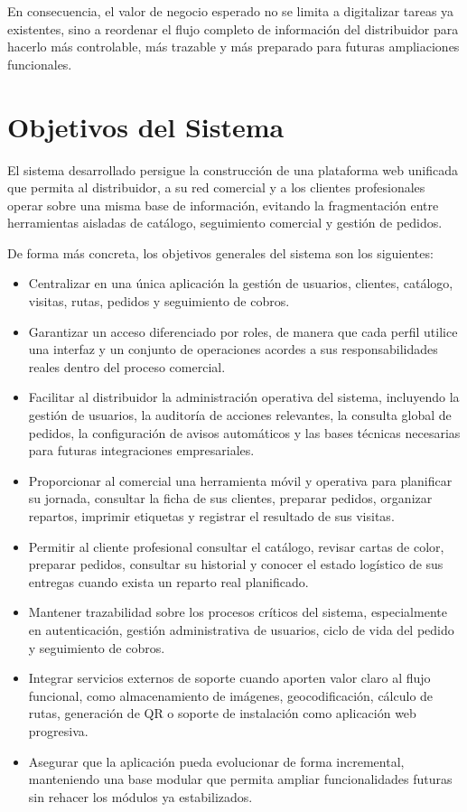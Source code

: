 En consecuencia, el valor de negocio esperado no se limita a digitalizar tareas ya existentes, sino a reordenar el flujo completo de información del distribuidor para hacerlo más controlable, más trazable y más preparado para futuras ampliaciones funcionales.

\section{Objetivos del Sistema}
El sistema desarrollado persigue la construcción de una plataforma web unificada que permita al distribuidor, a su red comercial y a los clientes profesionales operar sobre una misma base de información, evitando la fragmentación entre herramientas aisladas de catálogo, seguimiento comercial y gestión de pedidos.

De forma más concreta, los objetivos generales del sistema son los siguientes:

\begin{itemize}
    \item Centralizar en una única aplicación la gestión de usuarios, clientes, catálogo, visitas, rutas, pedidos y seguimiento de cobros.
    \item Garantizar un acceso diferenciado por roles, de manera que cada perfil utilice una interfaz y un conjunto de operaciones acordes a sus responsabilidades reales dentro del proceso comercial.
    \item Facilitar al distribuidor la administración operativa del sistema, incluyendo la gestión de usuarios, la auditoría de acciones relevantes, la consulta global de pedidos, la configuración de avisos automáticos y las bases técnicas necesarias para futuras integraciones empresariales.
    \item Proporcionar al comercial una herramienta móvil y operativa para planificar su jornada, consultar la ficha de sus clientes, preparar pedidos, organizar repartos, imprimir etiquetas y registrar el resultado de sus visitas.
    \item Permitir al cliente profesional consultar el catálogo, revisar cartas de color, preparar pedidos, consultar su historial y conocer el estado logístico de sus entregas cuando exista un reparto real planificado.
    \item Mantener trazabilidad sobre los procesos críticos del sistema, especialmente en autenticación, gestión administrativa de usuarios, ciclo de vida del pedido y seguimiento de cobros.
    \item Integrar servicios externos de soporte cuando aporten valor claro al flujo funcional, como almacenamiento de imágenes, geocodificación, cálculo de rutas, generación de QR o soporte de instalación como aplicación web progresiva.
    \item Asegurar que la aplicación pueda evolucionar de forma incremental, manteniendo una base modular que permita ampliar funcionalidades futuras sin rehacer los módulos ya estabilizados.
\end{itemize}

